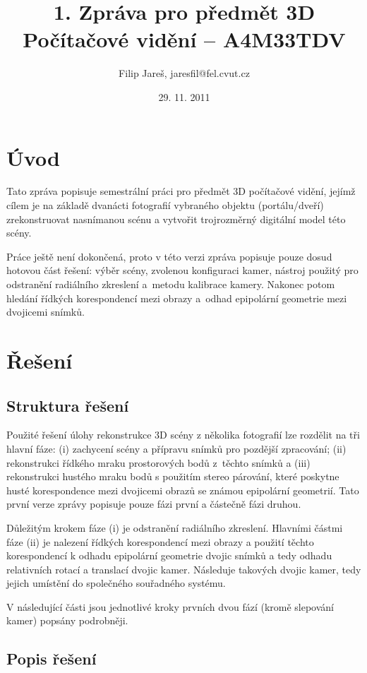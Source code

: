 \documentclass[11pt,oneside,a4paper,pdftex]{article}   %
\title{1. Zpráva pro předmět 3D Počítačové vidění -- A4M33TDV}
\date{29. 11. 2011}
\author{Filip Jareš, jaresfil@fel.cvut.cz}
\begin{document}
\maketitle

\section{Úvod}

Tato zpráva popisuje semestrální práci pro předmět 3D počítačové vidění, jejímž cílem je na základě
dvanácti fotografií vybraného objektu (portálu/dveří) zrekonstruovat nasnímanou scénu a vytvořit
trojrozměrný digitální model této scény.

Práce ještě není dokončená, proto v této verzi zpráva popisuje pouze dosud hotovou část řešení:
výběr scény, zvolenou konfiguraci kamer, nástroj použitý pro odstranění radiálního zkreslení
a~metodu kalibrace kamery. Nakonec potom hledání řídkých korespondencí mezi obrazy a~odhad
epipolární geometrie mezi dvojicemi snímků.

\section{Řešení}

\subsection{Struktura řešení}

Použité řešení úlohy rekonstrukce 3D scény z několika fotografií lze rozdělit na tři hlavní fáze:
(i) zachycení scény a přípravu snímků pro pozdější zpracování; (ii) rekonstrukci řídkého mraku
prostorových bodů z~těchto snímků a (iii) rekonstrukci hustého mraku bodů s použitím stereo párování,
které poskytne husté korespondence mezi dvojicemi obrazů se známou epipolární geometrií.
Tato první verze zprávy popisuje pouze fázi první a částečně fázi druhou.

Důležitým krokem fáze (i) je odstranění radiálního zkreslení. Hlavními částmi fáze (ii) je nalezení
řídkých korespondencí mezi obrazy a použití těchto korespondencí k odhadu epipolární geometrie
dvojic snímků a tedy odhadu relativních rotací a translací dvojic kamer. Následuje 
takových dvojic kamer, tedy jejich umístění do společného souřadného systému.

V následující části jsou jednotlivé kroky prvních dvou fází (kromě slepování kamer) popsány
podrobněji.

\subsection{Popis řešení}
\end{document}
